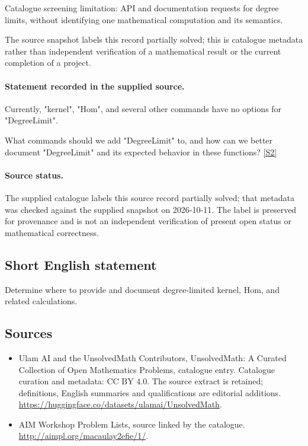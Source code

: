 \documentclass[11pt]{article}
\begin{document}
Catalogue screening limitation: API and documentation requests for degree limits, without identifying one mathematical computation and its semantics.

The source snapshot labels this record partially solved; this is catalogue metadata rather than independent verification of a mathematical result or the current completion of a project.
\paragraph{Statement recorded in the supplied source.}
Currently, "kernel", "Hom", and several other commands have no options for "DegreeLimit".

What commands should we add "DegreeLimit" to, and how can we better document "DegreeLimit" and its expected behavior in these functions? \href{http://aimpl.org/macaulay2efie/1/}{[S2]}
\paragraph{Source status.}
The supplied catalogue labels this source record partially solved; that metadata was checked against the supplied snapshot on 2026-10-11. The label is preserved for provenance and is not an independent verification of present open status or mathematical correctness.
\subsection{Short English statement}
Determine where to provide and document degree-limited kernel, Hom, and related calculations.
\subsection{Sources}
\begin{itemize}
\item[S1] Ulam AI and the UnsolvedMath Contributors, UnsolvedMath: A Curated Collection of Open Mathematics Problems, catalogue entry. Catalogue curation and metadata: CC BY 4.0. The source extract is retained; definitions, English summaries and qualifications are editorial additions.
\url{https://huggingface.co/datasets/ulamai/UnsolvedMath}.
\item[S2] AIM Workshop Problem Lists, source linked by the catalogue.
\url{http://aimpl.org/macaulay2efie/1/}.
\end{itemize}
\end{document}
